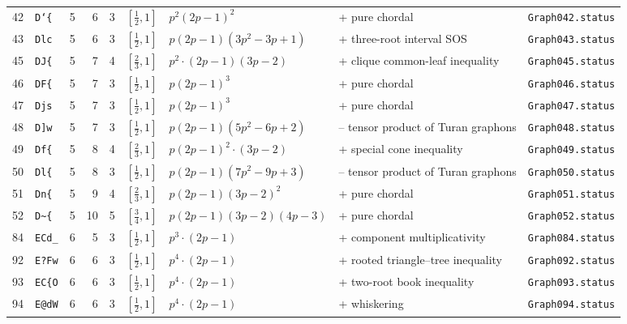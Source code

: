 \begin{landscape}
\begin{longtable}{r l r r r l p{4.0cm} p{3.5cm} p{2.7cm}}
42 & \texttt{D`\{} & 5 & 6 & 3 & $[\frac{1}{2},1]$ & $p^{2} \left(2 p - 1\right)^{2}$ & + pure chordal & \texttt{Graph042.status}\\
43 & \texttt{Dlc} & 5 & 6 & 3 & $[\frac{1}{2},1]$ & $p \left(2 p - 1\right) \left(3 p^{2} - 3 p + 1\right)$ & + three-root interval SOS & \texttt{Graph043.status}\\
45 & \texttt{DJ\{} & 5 & 7 & 4 & $[\frac{2}{3},1]$ & $p^{2} \cdot \left(2 p - 1\right) \left(3 p - 2\right)$ & + clique common-leaf inequality & \texttt{Graph045.status}\\
46 & \texttt{DF\{} & 5 & 7 & 3 & $[\frac{1}{2},1]$ & $p \left(2 p - 1\right)^{3}$ & + pure chordal & \texttt{Graph046.status}\\
47 & \texttt{Djs} & 5 & 7 & 3 & $[\frac{1}{2},1]$ & $p \left(2 p - 1\right)^{3}$ & + pure chordal & \texttt{Graph047.status}\\
48 & \texttt{D]w} & 5 & 7 & 3 & $[\frac{1}{2},1]$ & $p \left(2 p - 1\right) \left(5 p^{2} - 6 p + 2\right)$ & -- tensor product of Turan graphons & \texttt{Graph048.status}\\
49 & \texttt{Df\{} & 5 & 8 & 4 & $[\frac{2}{3},1]$ & $p \left(2 p - 1\right)^{2} \cdot \left(3 p - 2\right)$ & + special cone inequality & \texttt{Graph049.status}\\
50 & \texttt{Dl\{} & 5 & 8 & 3 & $[\frac{1}{2},1]$ & $p \left(2 p - 1\right) \left(7 p^{2} - 9 p + 3\right)$ & -- tensor product of Turan graphons & \texttt{Graph050.status}\\
51 & \texttt{Dn\{} & 5 & 9 & 4 & $[\frac{2}{3},1]$ & $p \left(2 p - 1\right) \left(3 p - 2\right)^{2}$ & + pure chordal & \texttt{Graph051.status}\\
52 & \texttt{D\textasciitilde{}\{} & 5 & 10 & 5 & $[\frac{3}{4},1]$ & $p \left(2 p - 1\right) \left(3 p - 2\right) \left(4 p - 3\right)$ & + pure chordal & \texttt{Graph052.status}\\
84 & \texttt{ECd\_} & 6 & 5 & 3 & $[\frac{1}{2},1]$ & $p^{3} \cdot \left(2 p - 1\right)$ & + component multiplicativity & \texttt{Graph084.status}\\
92 & \texttt{E?Fw} & 6 & 6 & 3 & $[\frac{1}{2},1]$ & $p^{4} \cdot \left(2 p - 1\right)$ & + rooted triangle--tree inequality & \texttt{Graph092.status}\\
93 & \texttt{EC\{O} & 6 & 6 & 3 & $[\frac{1}{2},1]$ & $p^{4} \cdot \left(2 p - 1\right)$ & + two-root book inequality & \texttt{Graph093.status}\\
94 & \texttt{E@dW} & 6 & 6 & 3 & $[\frac{1}{2},1]$ & $p^{4} \cdot \left(2 p - 1\right)$ & + whiskering & \texttt{Graph094.status}\\

\end{longtable}
\end{landscape}
